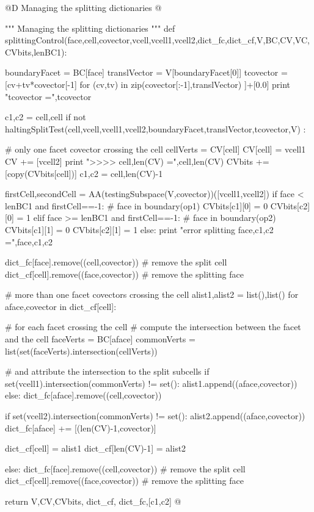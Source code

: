 \documentclass[11pt,oneside]{article}	%
\begin{document}
@D Managing the splitting dictionaries
@{""" Managing the splitting dictionaries """
def splittingControl(face,cell,covector,vcell,vcell1,vcell2,dict_fc,dict_cf,V,BC,CV,VC,CVbits,lenBC1):

	boundaryFacet = BC[face]
	translVector = V[boundaryFacet[0]]
	tcovector = [cv+tv*covector[-1] for (cv,tv) in zip(covector[:-1],translVector) ]+[0.0]
	print "tcovector =",tcovector

	c1,c2 = cell,cell
	if not haltingSplitTest(cell,vcell,vcell1,vcell2,boundaryFacet,translVector,tcovector,V) :

		# only one facet covector crossing the cell
		cellVerts = CV[cell]
		CV[cell] = vcell1
		CV += [vcell2]
		print "\n>>>> cell,len(CV) =",cell,len(CV)
		CVbits += [copy(CVbits[cell])]
		c1,c2 = cell,len(CV)-1
	
		firstCell,secondCell = AA(testingSubspace(V,covector))([vcell1,vcell2])
		if face < lenBC1 and firstCell==-1:  		# face in boundary(op1)
			CVbits[c1][0] = 0
			CVbits[c2][0] = 1
		elif face >= lenBC1 and firstCell==-1:  	# face in boundary(op2)
			CVbits[c1][1] = 0 
			CVbits[c2][1] = 1
		else: print "error splitting face,c1,c2 =",face,c1,c2
	
		dict_fc[face].remove((cell,covector))	# remove the split cell
		dict_cf[cell].remove((face,covector))	# remove the splitting face
				
		# more than one facet covectors crossing the cell
		alist1,alist2 = list(),list()
		for aface,covector in dict_cf[cell]:
		
			# for each facet crossing the cell
			# compute the intersection between the facet and the cell
			faceVerts = BC[aface]
			commonVerts = list(set(faceVerts).intersection(cellVerts))
			
			# and attribute the intersection to the split subcells
			if set(vcell1).intersection(commonVerts) != set():
				alist1.append((aface,covector))
			else: dict_fc[aface].remove((cell,covector)) 
					
			if set(vcell2).intersection(commonVerts) != set():
				alist2.append((aface,covector))
				dict_fc[aface] += [(len(CV)-1,covector)]
		
		dict_cf[cell] = alist1  
		dict_cf[len(CV)-1] = alist2
		
	else:
		dict_fc[face].remove((cell,covector))	# remove the split cell
		dict_cf[cell].remove((face,covector))	# remove the splitting face	
		
	return V,CV,CVbits, dict_cf, dict_fc,[c1,c2]
@}
\end{document}
